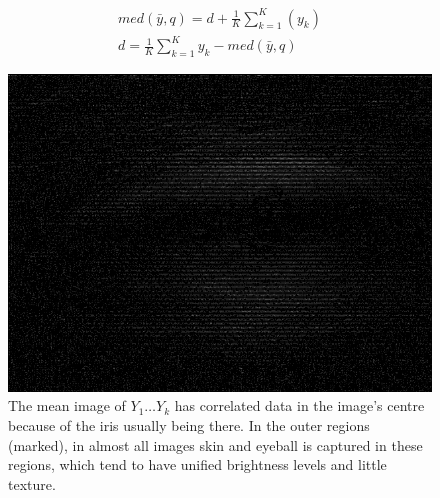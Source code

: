 \documentclass[10pt,twocolumn,letterpaper]{article}
\begin{document}
\begin{eqnarray}
med(\bar{y},q) = d+\frac{1}{K}\sum\limits_{k=1}^{K}(y_k) \\
d = \frac{1}{K}\sum\limits_{k=1}^{K}y_k - med(\bar{y},q)
\end{eqnarray}
\begin{figure}
\centering
\includegraphics[width=\linewidth]{img/correlated.png}
\caption{The mean image of $Y_1 \dots Y_k$ has correlated data in the image's centre because of the iris usually being there. In the outer regions (marked), in almost all images skin and eyeball is captured in these regions, which tend to have unified brightness levels and little texture.}
\label{fig:correlated}
\end{figure}
\end{document}
